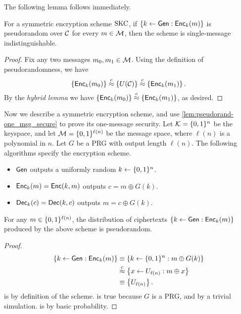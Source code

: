 \documentclass[11pt]{article}
\begin{document}
The following lemma follows immediately. 

\begin{lemma}
  \label{lem:pseudorand-one_msg_secure}
  For a symmetric encryption scheme $\text{SKC}$, if $\{k \gets \mathsf{Gen} :
    \mathsf{Enc}_k(m)\}$ is pseudorandom over $\mathcal{C}$ for every $m \in
  \mathcal{M}$, then the scheme is single-message indistinguishable.
\end{lemma}

\begin{proof}
  Fix any two messages $m_0, m_1 \in \mathcal{M}$.  Using the definition
  of pseudorandomness, we have
  \[ \left\{ \mathsf{Enc}_k(m_0) \right\} \stackrel{c}{\approx} \left\{ U(\mathcal{C})
  \right\} \stackrel{c}{\approx} \left\{ \mathsf{Enc}_k(m_1) \right\}. \] By the
  \emph{hybrid lemma} we have $ \left\{ \mathsf{Enc}_k(m_0) \right\}
  \stackrel{c}{\approx} \left\{ \mathsf{Enc}_k(m_1) \right\}$, as desired.
\end{proof}

Now we describe a symmetric encryption scheme, and use
\cref{lem:pseudorand-one_msg_secure} to prove its one-message
security.  Let $\mathcal{K} = \{0,1\}^n$ be the keyspace, and let
$\mathcal{M} = \{0,1\}^{\ell(n)}$ be the message space, where $\ell(n)$ is
a polynomial in $n$.  Let $G$ be a PRG with output length $\ell(n)$.
The following algorithms specify the encryption scheme.
\begin{itemize}
\item $\mathsf{Gen}$ outputs a uniformly random $k \gets \{0,1\}^{n}$.
\item $\mathsf{Enc}_k(m) = \mathsf{Enc}(k,m)$ outputs $c = m \oplus G(k)$.
\item $\mathsf{Dec}_k(c) = \mathsf{Dec}(k, c)$ outputs $m = c \oplus G(k)$.
\end{itemize}

\begin{claim}
  For any $m \in \{0,1\}^{\ell(n)}$, the distribution of ciphertexts
  $\left\{ k \gets \mathsf{Gen} : \mathsf{Enc}_k(m) \right\}$ produced by the
  above scheme is pseudorandom.
\end{claim}

\begin{proof}
  \begin{align}
    \left\{ k \gets \mathsf{Gen} : \mathsf{Enc}_k(m) \right\} &\equiv
    \left\{ k \gets \{0,1\}^{n} : m \oplus G(k) \right\} \label{eq:scheme} \\
    &\stackrel{c}{\approx} \left\{ x \gets U_{\ell(n)} : m \oplus x
    \right\} \label{eq:prg} \\
    &\equiv \left\{ U_{\ell(n)} \right\}. \label{eq:prob}
  \end{align}
   is by definition of the scheme.   is
  true because $G$ is a PRG, and by a trivial
  simulation.  is by basic probability.
\end{proof}
\end{document}
